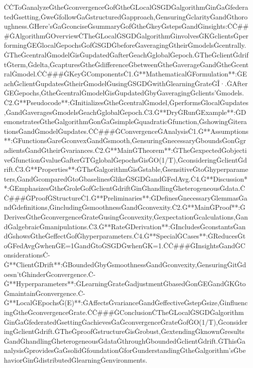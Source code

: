 \documentclass{article}
\begin{document}
ĊĊToĠanalyzeĠtheĠconvergenceĠofĠtheĠLocalĠSGDĠalgorithmĠinĠaĠfederatedĠsetting,ĠweĠfollowĠaĠstructuredĠapproach,ĠensuringĠclarityĠandĠthoroughness.ĠHere'sĠaĠconciseĠsummaryĠofĠtheĠkeyĠstepsĠandĠinsights:ĊĊ###ĠAlgorithmĠOverviewĊTheĠLocalĠSGDĠalgorithmĠinvolvesĠKĠclientsĠperformingĠEĠlocalĠepochsĠofĠSGDĠbeforeĠaveragingĠtheirĠmodelsĠcentrally.ĠTheĠcentralĠmodelĠisĠupdatedĠafterĠeachĠglobalĠepoch.ĠTheĠclientĠdriftĠterm,Ġdelta,ĠcapturesĠtheĠdifferenceĠbetweenĠtheĠaverageĠandĠtheĠcentralĠmodel.ĊĊ###ĠKeyĠComponentsĊ1.Ġ**MathematicalĠFormulation**:ĠEachĠclientĠupdatesĠtheirĠmodelĠusingĠSGDĠwithĠlearningĠrateĠÎ·.ĠAfterĠEĠepochs,ĠtheĠcentralĠmodelĠisĠupdatedĠbyĠaveragingĠclients'Ġmodels.Ċ2.Ġ**Pseudocode**:ĠInitializesĠtheĠcentralĠmodel,ĠperformsĠlocalĠupdates,ĠandĠaveragesĠmodelsĠeachĠglobalĠepoch.Ċ3.Ġ**DryĠRunĠExample**:ĠDemonstratesĠtheĠalgorithmĠonĠaĠsimpleĠquadraticĠfunction,ĠshowingĠiterationsĠandĠmodelĠupdates.ĊĊ###ĠConvergenceĠAnalysisĊ1.Ġ**Assumptions**:ĠFunctionsĠareĠconvexĠandĠsmooth,ĠensuringĠnecessaryĠboundsĠonĠgradientsĠandĠtheirĠvariances.Ċ2.Ġ**MainĠTheorem**:ĠTheĠexpectedĠobjectiveĠfunctionĠvalueĠafterĠTĠglobalĠepochsĠisĠO(1/T),ĠconsideringĠclientĠdrift.Ċ3.Ġ**Properties**:ĠTheĠalgorithmĠisĠstable,ĠsensitiveĠtoĠhyperparameters,ĠandĠcomparedĠtoĠbaselinesĠlikeĠSGDĠandĠFedAvg.Ċ4.Ġ**Discussion**:ĠEmphasizesĠtheĠroleĠofĠclientĠdriftĠinĠhandlingĠheterogeneousĠdata.ĊĊ###ĠProofĠStructureĊ1.Ġ**Preliminaries**:ĠDefinesĠnecessaryĠlemmasĠandĠdefinitions,ĠincludingĠsmoothnessĠandĠconvexity.Ċ2.Ġ**MainĠProof**:ĠDerivesĠtheĠconvergenceĠrateĠusingĠconvexity,ĠexpectationĠcalculations,ĠandĠalgebraicĠmanipulations.Ċ3.Ġ**RateĠDerivation**:ĠIncludesĠconstantsĠandĠshowsĠtheĠeffectĠofĠhyperparameters.Ċ4.Ġ**SpecialĠCases**:ĠReducesĠtoĠFedAvgĠwhenĠE=1ĠandĠtoĠSGDĠwhenĠK=1.ĊĊ###ĠInsightsĠandĠConsiderationsĊ-Ġ**ClientĠDrift**:ĠBoundedĠbyĠsmoothnessĠandĠconvexity,ĠensuringĠitĠdoesn'tĠhinderĠconvergence.Ċ-Ġ**Hyperparameters**:ĠLearningĠrateĠadjustmentĠbasedĠonĠEĠandĠKĠtoĠmaintainĠconvergence.Ċ-Ġ**LocalĠEpochsĠ(E)**:ĠAffectsĠvarianceĠandĠeffectiveĠstepĠsize,ĠinfluencingĠtheĠconvergenceĠrate.ĊĊ###ĠConclusionĊTheĠLocalĠSGDĠalgorithmĠinĠaĠfederatedĠsettingĠachievesĠaĠconvergenceĠrateĠofĠO(1/T),ĠconsideringĠclientĠdrift.ĠTheĠproofĠstructureĠisĠrobust,ĠextendingĠknownĠresultsĠandĠhandlingĠheterogeneousĠdataĠthroughĠboundedĠclientĠdrift.ĠThisĠanalysisĠprovidesĠaĠsolidĠfoundationĠforĠunderstandingĠtheĠalgorithm'sĠbehaviorĠinĠdistributedĠlearningĠenvironments.
\end{document}
